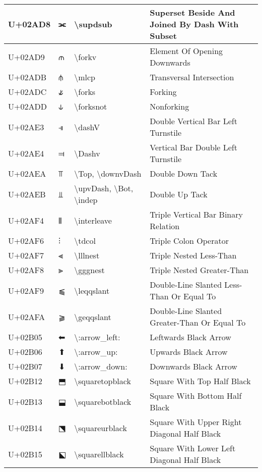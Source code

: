 \begin{table}[h]
\begin{tabulary}{\linewidth}{|L|L|L|L|}
\hline
U+02AD8 & ⫘ & {\textbackslash}supdsub & Superset Beside And Joined By Dash With Subset \\
\hline
U+02AD9 & ⫙ & {\textbackslash}forkv & Element Of Opening Downwards \\
\hline
U+02ADB & ⫛ & {\textbackslash}mlcp & Transversal Intersection \\
\hline
U+02ADC & ⫝̸ & {\textbackslash}forks & Forking \\
\hline
U+02ADD & ⫝ & {\textbackslash}forksnot & Nonforking \\
\hline
U+02AE3 & ⫣ & {\textbackslash}dashV & Double Vertical Bar Left Turnstile \\
\hline
U+02AE4 & ⫤ & {\textbackslash}Dashv & Vertical Bar Double Left Turnstile \\
\hline
U+02AEA & ⫪ & {\textbackslash}Top, {\textbackslash}downvDash & Double Down Tack \\
\hline
U+02AEB & ⫫ & {\textbackslash}upvDash, {\textbackslash}Bot, {\textbackslash}indep & Double Up Tack \\
\hline
U+02AF4 & ⫴ & {\textbackslash}interleave & Triple Vertical Bar Binary Relation \\
\hline
U+02AF6 & ⫶ & {\textbackslash}tdcol & Triple Colon Operator \\
\hline
U+02AF7 & ⫷ & {\textbackslash}lllnest & Triple Nested Less-Than \\
\hline
U+02AF8 & ⫸ & {\textbackslash}gggnest & Triple Nested Greater-Than \\
\hline
U+02AF9 & ⫹ & {\textbackslash}leqqslant & Double-Line Slanted Less-Than Or Equal To \\
\hline
U+02AFA & ⫺ & {\textbackslash}geqqslant & Double-Line Slanted Greater-Than Or Equal To \\
\hline
U+02B05 & ⬅ & {\textbackslash}:arrow\_left: & Leftwards Black Arrow \\
\hline
U+02B06 & ⬆ & {\textbackslash}:arrow\_up: & Upwards Black Arrow \\
\hline
U+02B07 & ⬇ & {\textbackslash}:arrow\_down: & Downwards Black Arrow \\
\hline
U+02B12 & ⬒ & {\textbackslash}squaretopblack & Square With Top Half Black \\
\hline
U+02B13 & ⬓ & {\textbackslash}squarebotblack & Square With Bottom Half Black \\
\hline
U+02B14 & ⬔ & {\textbackslash}squareurblack & Square With Upper Right Diagonal Half Black \\
\hline
U+02B15 & ⬕ & {\textbackslash}squarellblack & Square With Lower Left Diagonal Half Black \\

\end{tabulary}
\end{table}

